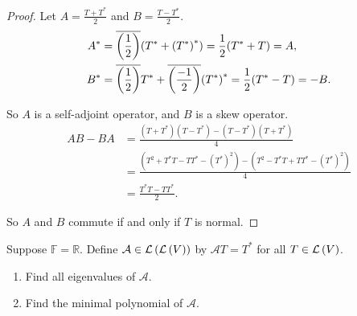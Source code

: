 \begin{proof}
    Let $A = \frac{T + T^{*}}{2}$ and $B = \frac{T - T^{*}}{2}$.
    \begin{align*}
        A^{*} & = \overline{\left(\frac{1}{2}\right)}(T^{*} + {(T^{*})}^{*}) = \frac{1}{2}(T^{*} + T) = A, \\
        B^{*} & = \overline{\left(\frac{1}{2}\right)}T^{*} + \overline{\left(\frac{-1}{2}\right)}{(T^{*})}^{*} = \frac{1}{2}(T^{*} - T) = -B.
    \end{align*}

    So $A$ is a self-adjoint operator, and $B$ is a skew operator.
    \begin{align*}
        AB - BA & = \frac{(T + T^{*})(T - T^{*}) - (T - T^{*})(T + T^{*})}{4} \\
                & = \frac{(T^{2} + T^{*}T - TT^{*} - {(T^{*})}^{2}) - (T^{2} - T^{*}T + TT^{*} - {(T^{*})}^{2})}{4} \\
                & = \frac{T^{*}T - TT^{*}}{2}.
    \end{align*}

    So $A$ and $B$ commute if and only if $T$ is normal.
\end{proof}
\newpage

\begin{exercise}
    Suppose $\mathbb{F} = \mathbb{R}$. Define $\mathcal{A}\in \mathcal{L}\left({\mathcal{L}\left({V}\right)}\right)$ by $\mathcal{A}T = T^{*}$ for all $T\in\mathcal{L}\left({V}\right)$.
    \begin{enumerate}[label={(\alph*)}]
        \item Find all eigenvalues of $\mathcal{A}$.
        \item Find the minimal polynomial of $\mathcal{A}$.
    \end{enumerate}
\end{exercise}

